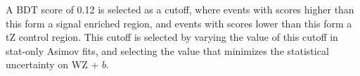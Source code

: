 

A BDT score of 0.12 is selected as a cutoff, where events with scores higher than this form a signal enriched region, and events with scores lower than this form a tZ control region. This cutoff is selected by varying the value of this cutoff in stat-only Asimov fits, and selecting the value that minimizes the statistical uncertainty on WZ + $b$.


